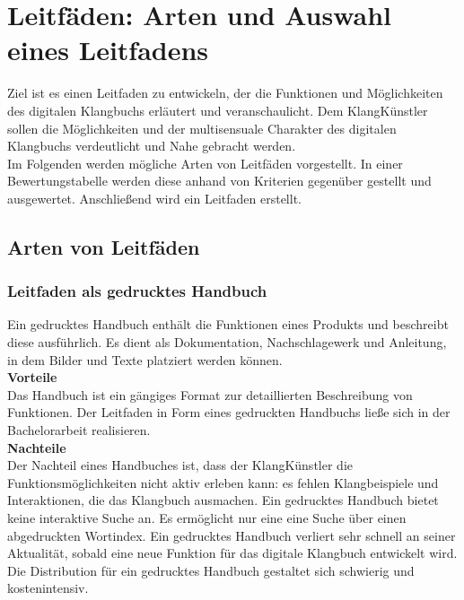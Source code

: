 \chapter{Leitfäden: Arten und Auswahl eines Leitfadens}

Ziel ist es einen Leitfaden zu entwickeln, der die Funktionen und Möglichkeiten des digitalen Klangbuchs erläutert und veranschaulicht. Dem KlangKünstler sollen die Möglichkeiten und der multisensuale Charakter des digitalen Klangbuchs verdeutlicht und Nahe gebracht werden.\\

Im Folgenden werden mögliche Arten von Leitfäden vorgestellt. In einer Bewertungstabelle werden diese anhand von Kriterien gegenüber gestellt und ausgewertet. Anschließend wird ein Leitfaden erstellt.

\section{Arten von Leitfäden}




\subsection{Leitfaden als gedrucktes Handbuch}
Ein gedrucktes Handbuch enthält die Funktionen eines Produkts und beschreibt diese ausführlich. Es dient als Dokumentation, Nachschlagewerk und Anleitung, in dem Bilder und Texte platziert werden können.\\

\textbf{Vorteile}\\
Das Handbuch ist ein gängiges Format zur detaillierten Beschreibung von Funktionen. Der Leitfaden in Form eines gedruckten Handbuchs ließe sich in der Bachelorarbeit realisieren.\\

\textbf{Nachteile}\\
Der Nachteil eines Handbuches ist, dass der KlangKünstler die Funktionsmöglichkeiten nicht aktiv erleben kann: es fehlen Klangbeispiele und Interaktionen, die das Klangbuch ausmachen. Ein gedrucktes Handbuch bietet keine interaktive Suche an. Es ermöglicht nur eine eine Suche über einen abgedruckten Wortindex. Ein gedrucktes Handbuch verliert sehr schnell an seiner Aktualität, sobald eine neue Funktion für das digitale Klangbuch entwickelt wird. Die Distribution für ein gedrucktes Handbuch gestaltet sich schwierig und kostenintensiv.

